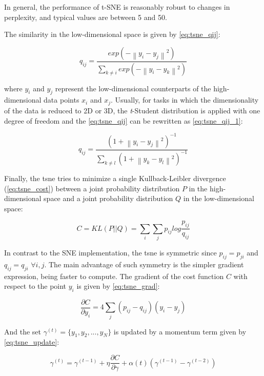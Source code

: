 In general, the performance of t-SNE is reasonably robust to changes in perplexity, and typical values are between 5 and 50.

The similarity in the low-dimensional space is given by \autoref{eq:tsne_qij}:

\begin{equation}
\label{eq:tsne_qij}
q_{ij} = \frac{exp(-\left\| y_i - y_j \right\|^2)}{\sum_{k \neq i} exp(-\left\| y_i - y_k \right\|^2)}
\end{equation}

\noindent
where $y_i$ and $y_j$ represent the low-dimensional counterparts of the
high-dimensional data points $x_i$ and $x_j$. Usually, for tasks in which the dimensionality of the data is reduced to 2D or 3D, the \textit{t}-Student distribution is applied with one degree of freedom and the \autoref{eq:tsne_qij} can be rewritten as \autoref{eq:tsne_qij_1}:

\begin{equation}
\label{eq:tsne_qij_1}
q_{ij} = \frac{(1 +\left\| y_i - y_j \right\|^2)^{-1}}{\sum_{k \neq l} (1 +\left\| y_k - y_l \right\|^2)^{-1}}
\end{equation}

Finally, the \acs{tsne} tries to minimize a single Kullback-Leibler divergence (\autoref{eq:tsne_cost}) between a joint probability distribution $P$ in the high-dimensional space and a joint probability distribution $Q$ in the low-dimensional space:

\begin{equation}
\label{eq:tsne_cost}
C = KL(P||Q) = \sum_i\sum_j p_{ij} log \frac{p_{ij}}{q_{ij}}
\end{equation}

In contrast to the SNE implementation, the \acs{tsne} is symmetric since $p_{ij} = p_{ji}$ and $q_{ij} = q_{ji}$ $\forall i,j$. The main advantage of such symmetry is the simpler gradient expression, being faster to compute. The gradient of the cost function $C$ with respect to the point $y_i$ is given by \autoref{eq:tsne_grad}:

\begin{equation}
\label{eq:tsne_grad}
\frac{\partial C}{\partial y_i} = 4 \sum_j (p_{ij} - q_{ij})(y_i - y_j)
\end{equation}

And the set $\gamma^{(t)} = \{y_1, y_2, ..., y_N\}$ is updated by a momentum term given by \autoref{eq:tsne_update}:

\begin{equation}
\label{eq:tsne_update}
\gamma^{(t)} = \gamma^{(t-1)} + \eta\frac{\partial C}{\partial \gamma} + \alpha(t)(\gamma^{(t-1)} - \gamma^{(t-2)})
\end{equation}

